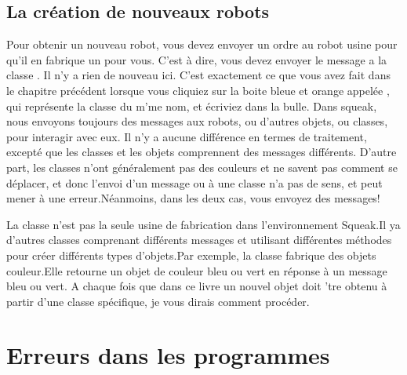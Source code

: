 \documentclass[a4paper,10pt,twoside]{book}
\begin{document}

\subsection{La cr\'eation de nouveaux robots}

Pour obtenir un nouveau robot, vous devez envoyer un ordre au robot usine pour qu'il en fabrique un pour vous. C'est \`a dire, vous devez envoyer le message  a la classe . Il n'y a rien de nouveau ici. C'est exactement ce que vous avez fait dans le chapitre pr\'ec\'edent lorsque vous cliquiez sur la boite bleue et orange appel\'ee , qui repr\'esente la classe du m'me nom, et \'ecriviez  dans la bulle. Dans squeak, nous envoyons toujours des messages aux robots, ou d'autres objets, ou classes, pour interagir avec eux. Il n'y a aucune diff\'erence en termes de traitement, except\'e que les classes et les objets comprennent des messages diff\'erents. D'autre part, les classes n'ont g\'en\'eralement pas des couleurs et ne savent pas comment se d\'eplacer, et donc l'envoi d'un message  ou  \`a une classe n'a pas de sens, et peut  mener \`a une erreur.N\'eanmoins, dans les deux cas, vous envoyez des messages!

La classe  n'est pas la seule usine de fabrication dans l'environnement Squeak.Il ya d'autres classes comprenant diff\'erents  messages et utilisant diff\'erentes m\'ethodes pour cr\'eer diff\'erents types d'objets.Par exemple, la classe  fabrique des objets couleur.Elle retourne un objet de couleur bleu ou vert en r\'eponse \`a un message bleu ou vert. A chaque fois que dans ce livre un nouvel objet doit 'tre obtenu \`a partir d'une classe sp\'ecifique, je vous dirais comment proc\'eder.


\section{Erreurs dans les programmes}
\end{document}
